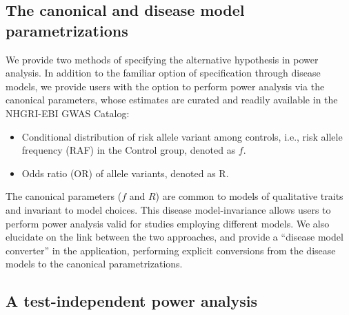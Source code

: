 


\subsection{The canonical and disease model parametrizations}

We provide two methods of specifying the alternative hypothesis in power analysis.
In addition to the familiar option of specification through disease models, we provide users with the option to perform power analysis via the canonical parameters, whose estimates are curated and readily available in the NHGRI-EBI GWAS Catalog:
\begin{itemize}
    \item Conditional distribution of risk allele variant among controls, i.e., risk allele frequency (RAF) in the Control group, denoted as $f$.
    \item Odds ratio (OR) of allele variants, denoted as $\text{R}$.
\end{itemize}
The canonical parameters ($f$ and $R$) are common to models of qualitative traits and invariant to model choices. 
This disease model-invariance allows users to perform power analysis valid for studies employing different models.
We also elucidate on the link between the two approaches, and provide a ``disease model converter'' in the application, performing explicit conversions from the disease models to the canonical parametrizations.



\vspace{-5pt}
\subsection{A test-independent power analysis}

